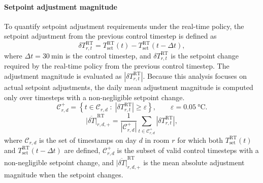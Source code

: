 \paragraph{Setpoint adjustment magnitude}
To quantify setpoint adjustment requirements under the real-time policy, the setpoint adjustment from the previous control timestep is defined as
\begin{equation}
\delta T_{r,t}^{\mathrm{RT}}
=
T_{\mathrm{set}}^{\mathrm{RT}}(t)
-
T_{\mathrm{set}}^{\mathrm{RT}}(t-\Delta t),
\label{eq:rt_setpoint_step}
\end{equation}
where $\Delta t=\qty{30}{\minute}$ is the control timestep, and $\delta T_{r,t}^{\mathrm{RT}}$ is the setpoint change required by the real-time policy from the previous control timestep.
The adjustment magnitude is evaluated as $|\delta T_{r,t}^{\mathrm{RT}}|$.
Because this analysis focuses on actual setpoint adjustments, the daily mean adjustment magnitude is computed only over timesteps with a non-negligible setpoint change.
\begin{equation}
\mathcal{C}_{r,d}^{+}
=
\left\{
t\in\mathcal{C}_{r,d}
\;:\;
\left|\delta T_{r,t}^{\mathrm{RT}}\right| \geq \varepsilon
\right\},
\qquad
\varepsilon=\qty{0.05}{\celsius}.
\label{eq:changed_step_set}
\end{equation}
\begin{equation}
\overline{|\delta T|}_{r,d,+}^{\mathrm{RT}}
=
\frac{1}{|\mathcal{C}_{r,d}^{+}|}
\sum_{t\in\mathcal{C}_{r,d}^{+}}
\left|\delta T_{r,t}^{\mathrm{RT}}\right|,
\label{eq:rt_mean_abs_step_when_changed_daily}
\end{equation}
where $\mathcal{C}_{r,d}$ is the set of timestamps on day $d$ in room $r$ for which both $T_{\mathrm{set}}^{\mathrm{RT}}(t)$ and $T_{\mathrm{set}}^{\mathrm{RT}}(t-\Delta t)$ are defined, $\mathcal{C}_{r,d}^{+}$ is the subset of valid control timesteps with a non-negligible setpoint change, and $\overline{|\delta T|}_{r,d,+}^{\mathrm{RT}}$ is the mean absolute adjustment magnitude when the setpoint changes.

